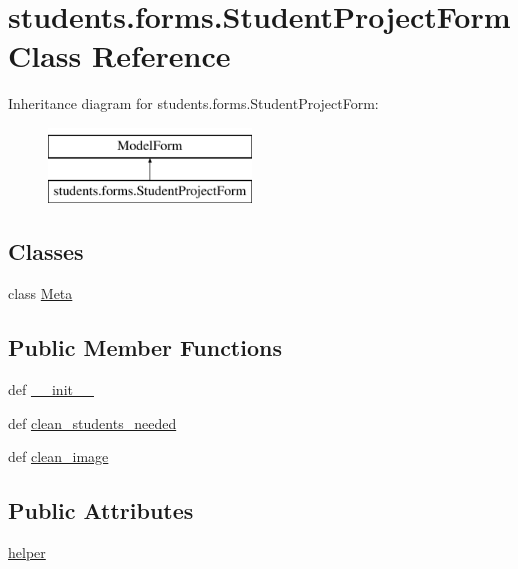 \hypertarget{classstudents_1_1forms_1_1_student_project_form}{\section{students.\-forms.\-Student\-Project\-Form Class Reference}
\label{classstudents_1_1forms_1_1_student_project_form}
}
Inheritance diagram for students.\-forms.\-Student\-Project\-Form\-:\begin{figure}[H]
\begin{center}
\leavevmode
\includegraphics[height=2.000000cm]{classstudents_1_1forms_1_1_student_project_form}
\end{center}
\end{figure}
\subsection*{Classes}
\begin{DoxyCompactItemize}
\item 
class \hyperlink{classstudents_1_1forms_1_1_student_project_form_1_1_meta}{Meta}
\end{DoxyCompactItemize}
\subsection*{Public Member Functions}
\begin{DoxyCompactItemize}
\item 
def \hyperlink{classstudents_1_1forms_1_1_student_project_form_ae9df8bc4e1e2227f05ff0007adfd9e54}{\-\_\-\-\_\-init\-\_\-\-\_\-}
\item 
def \hyperlink{classstudents_1_1forms_1_1_student_project_form_a5458cd762e0b409ec6c796d1b2933f72}{clean\-\_\-students\-\_\-needed}
\item 
def \hyperlink{classstudents_1_1forms_1_1_student_project_form_a84ef8d595a169f889ebd696f9aa0d17e}{clean\-\_\-image}
\end{DoxyCompactItemize}
\subsection*{Public Attributes}
\begin{DoxyCompactItemize}
\item 
\hyperlink{classstudents_1_1forms_1_1_student_project_form_adc6a7a4cceaee86d2cf8370f4993ae99}{helper}
\end{DoxyCompactItemize}
